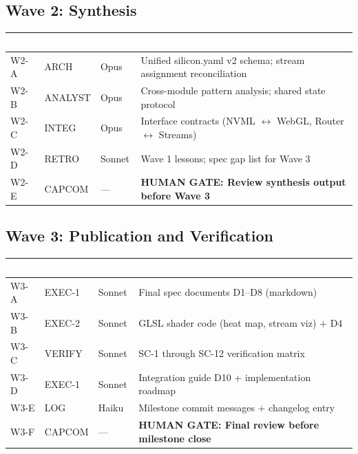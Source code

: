 \documentclass[11pt,letterpaper]{article}
\newcommand{\tableheader}[1]{\textbf{\sffamily\textcolor{white}{#1}}}
\begin{document}
\subsection{Wave 2: Synthesis}

\begin{center}
\begin{tabularx}{\textwidth}{L{2.5cm}L{2.5cm}C{1.4cm}X}
\toprule
{}
\tableheader{Task} & \tableheader{Agent} & \tableheader{Model} & \tableheader{Output} \\
\midrule
W2-A & ARCH & Opus & Unified silicon.yaml v2 schema; stream assignment reconciliation \\
W2-B & ANALYST & Opus & Cross-module pattern analysis; shared state protocol \\
W2-C & INTEG & Opus & Interface contracts (NVML $\leftrightarrow$ WebGL, Router $\leftrightarrow$ Streams) \\
W2-D & RETRO & Sonnet & Wave 1 lessons; spec gap list for Wave 3 \\
W2-E & CAPCOM & --- & \textbf{HUMAN GATE: Review synthesis output before Wave 3} \\
\bottomrule
\end{tabularx}
\end{center}

\subsection{Wave 3: Publication and Verification}

\begin{center}
\begin{tabularx}{\textwidth}{L{2.5cm}L{2.5cm}C{1.4cm}X}
\toprule
{}
\tableheader{Task} & \tableheader{Agent} & \tableheader{Model} & \tableheader{Output} \\
\midrule
W3-A & EXEC-1 & Sonnet & Final spec documents D1--D8 (markdown) \\
W3-B & EXEC-2 & Sonnet & GLSL shader code (heat map, stream viz) + D4 \\
W3-C & VERIFY & Sonnet & SC-1 through SC-12 verification matrix \\
W3-D & EXEC-1 & Sonnet & Integration guide D10 + implementation roadmap \\
W3-E & LOG & Haiku & Milestone commit messages + changelog entry \\
W3-F & CAPCOM & --- & \textbf{HUMAN GATE: Final review before milestone close} \\
\bottomrule
\end{tabularx}
\end{center}
\end{document}

